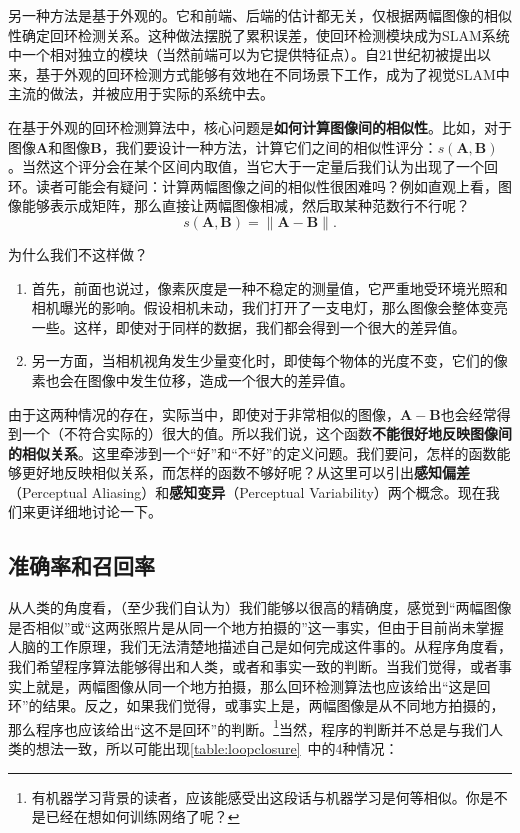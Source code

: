 另一种方法是基于外观的。它和前端、后端的估计都无关，仅根据两幅图像的相似性确定回环检测关系。这种做法摆脱了累积误差，使回环检测模块成为SLAM系统中一个相对独立的模块（当然前端可以为它提供特征点）。自21世纪初被提出以来，基于外观的回环检测方式能够有效地在不同场景下工作，成为了视觉SLAM中主流的做法，并被应用于实际的系统中去\textsuperscript{\cite{Ulrich2000, Latif2013, Mur-Artal2015}}。

在基于外观的回环检测算法中，核心问题是\textbf{如何计算图像间的相似性}。比如，对于图像$\bm{A}$和图像$\bm{B}$，我们要设计一种方法，计算它们之间的相似性评分：$s(\bm{A}, \bm{B})$。当然这个评分会在某个区间内取值，当它大于一定量后我们认为出现了一个回环。读者可能会有疑问：计算两幅图像之间的相似性很困难吗？例如直观上看，图像能够表示成矩阵，那么直接让两幅图像相减，然后取某种范数行不行呢？
\clearpage
\begin{equation}
s(\bm{A}, \bm{B}) = \| \bm{A}-\bm{B} \|.
\end{equation}

为什么我们不这样做？

\begin{enumerate}
	\item 首先，前面也说过，像素灰度是一种不稳定的测量值，它严重地受环境光照和相机曝光的影响。假设相机未动，我们打开了一支电灯，那么图像会整体变亮一些。这样，即使对于同样的数据，我们都会得到一个很大的差异值。
	\item 另一方面，当相机视角发生少量变化时，即使每个物体的光度不变，它们的像素也会在图像中发生位移，造成一个很大的差异值。
\end{enumerate}

由于这两种情况的存在，实际当中，即使对于非常相似的图像，$\bm{A}-\bm{B}$也会经常得到一个（不符合实际的）很大的值。所以我们说，这个函数\textbf{不能很好地反映图像间的相似关系}。这里牵涉到一个“好”和“不好”的定义问题。我们要问，怎样的函数能够更好地反映相似关系，而怎样的函数不够好呢？从这里可以引出\textbf{感知偏差}（Perceptual Aliasing）和\textbf{感知变异}（Perceptual Variability）两个概念。现在我们来更详细地讨论一下。

\subsection{准确率和召回率}
从人类的角度看，（至少我们自认为）我们能够以很高的精确度，感觉到“两幅图像是否相似”或“这两张照片是从同一个地方拍摄的”这一事实，但由于目前尚未掌握人脑的工作原理，我们无法清楚地描述自己是如何完成这件事的。从程序角度看，我们希望程序算法能够得出和人类，或者和事实一致的判断。当我们觉得，或者事实上就是，两幅图像从同一个地方拍摄，那么回环检测算法也应该给出“这是回环”的结果。反之，如果我们觉得，或事实上是，两幅图像是从不同地方拍摄的，那么程序也应该给出“这不是回环”的判断。\footnote{有机器学习背景的读者，应该能感受出这段话与机器学习是何等相似。你是不是已经在想如何训练网络了呢？}当然，程序的判断并不总是与我们人类的想法一致，所以可能出现\autoref{table:loopclosure}~中的4种情况：

